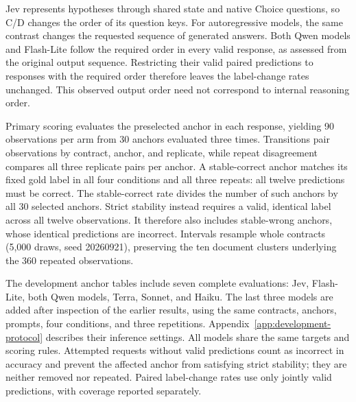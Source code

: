 Jev represents hypotheses through shared state and native Choice questions, so C/D changes the order of its question keys. For autoregressive models, the same contrast changes the requested sequence of generated answers. Both Qwen models and Flash-Lite follow the required order in every valid response, as assessed from the original output sequence. Restricting their valid paired predictions to responses with the required order therefore leaves the label-change rates unchanged. This observed output order need not correspond to internal reasoning order.

Primary scoring evaluates the preselected anchor in each response, yielding 90 observations per arm from 30 anchors evaluated three times. Transitions pair observations by contract, anchor, and replicate, while repeat disagreement compares all three replicate pairs per anchor. A stable-correct anchor matches its fixed gold label in all four conditions and all three repeats: all twelve predictions must be correct. The stable-correct rate divides the number of such anchors by all 30 selected anchors. Strict stability instead requires a valid, identical label across all twelve observations. It therefore also includes stable-wrong anchors, whose identical predictions are incorrect. Intervals resample whole contracts (5,000 draws, seed 20260921), preserving the ten document clusters underlying the 360 repeated observations.

The development anchor tables include seven complete evaluations: Jev, Flash-Lite, both Qwen models, Terra, Sonnet, and Haiku. The last three models are added after inspection of the earlier results, using the same contracts, anchors, prompts, four conditions, and three repetitions. Appendix~\ref{app:development-protocol} describes their inference settings. All models share the same targets and scoring rules. Attempted requests without valid predictions count as incorrect in accuracy and prevent the affected anchor from satisfying strict stability; they are neither removed nor repeated. Paired label-change rates use only jointly valid predictions, with coverage reported separately.




